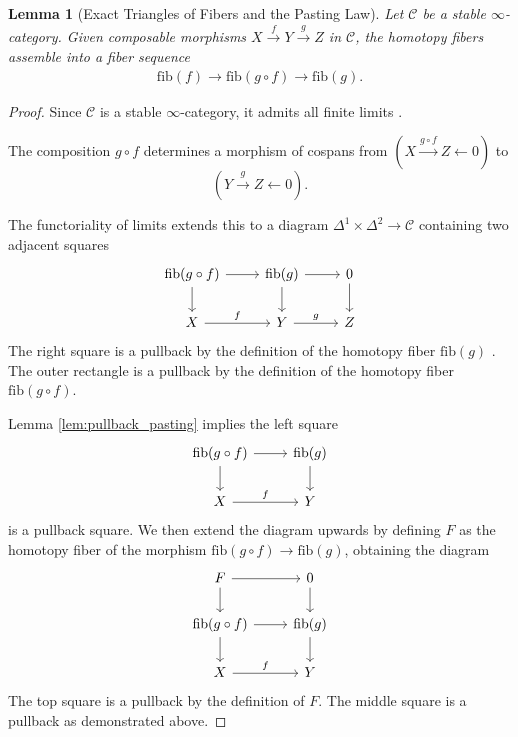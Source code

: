 \documentclass[reqno]{amsart}
\newtheorem{lemma}[theorem]{Lemma}
\theoremstyle{definition}
\theoremstyle{remark}
\begin{document}
\begin{lemma}[Exact Triangles of Fibers and the Pasting Law]
  \label{lem:pasting_law}
  Let $\mathcal{C}$ be a stable $\infty$-category. Given composable
  morphisms $X \xrightarrow{f} Y \xrightarrow{g} Z$ in $\mathcal{C}$,
  the homotopy fibers assemble into a fiber sequence
  \begin{align*}
    \mathrm{fib}(f) \to \mathrm{fib}(g \circ f) \to \mathrm{fib}(g).
  \end{align*}
\end{lemma}
\begin{proof}
  Since $\mathcal{C}$ is a stable $\infty$-category, it admits all finite limits \cite[Proposition 1.1.3.4]{LurieHA}. 
  
  \noindent The composition $g \circ f$ determines a  morphism of cospans from $(X \xrightarrow{g \circ f} Z \leftarrow 0)$ to $$(Y \xrightarrow{g} Z \leftarrow 0).$$ 
  
  The functoriality of limits extends this to a diagram $\Delta^1 \times \Delta^2 \to \mathcal{C}$ containing two adjacent squares
  \begin{align*}
    \begin{tikzcd}[ampersand replacement=\&]
      \mathrm{fib}(g \circ f) \arrow[r] \arrow[d] \& \mathrm{fib}(g) \arrow[r] \arrow[d] \& 0 \arrow[d] \\
      X \arrow[r, "f"] \& Y \arrow[r, "g"] \& Z
    \end{tikzcd}
  \end{align*}
  The right square is a pullback by the definition of the homotopy fiber $\mathrm{fib}(g)$ \cite[Definition 1.1.1.6]{LurieHA}.
  The outer rectangle is a pullback by the definition of the homotopy fiber $\mathrm{fib}(g \circ f)$.
  
  Lemma \ref{lem:pullback_pasting} implies the left square
  \begin{align*}
    \begin{tikzcd}[ampersand replacement=\&]
      \mathrm{fib}(g \circ f) \arrow[r] \arrow[d] \& \mathrm{fib}(g) \arrow[d] \\
      X \arrow[r, "f"] \& Y
    \end{tikzcd}
  \end{align*}
  is a pullback square.
  We then extend the diagram upwards by defining $F$ as the homotopy fiber of the morphism $\mathrm{fib}(g \circ f) \to \mathrm{fib}(g)$, obtaining the diagram
  \begin{align*}
    \begin{tikzcd}[ampersand replacement=\&]
      F \arrow[r] \arrow[d] \& 0 \arrow[d] \\
      \mathrm{fib}(g \circ f) \arrow[r] \arrow[d] \& \mathrm{fib}(g) \arrow[d] \\
      X \arrow[r, "f"] \& Y
    \end{tikzcd}
  \end{align*}
  The top square is a pullback by the definition of $F$. The middle square is a pullback as demonstrated above. 
  

\end{proof}
\end{document}
